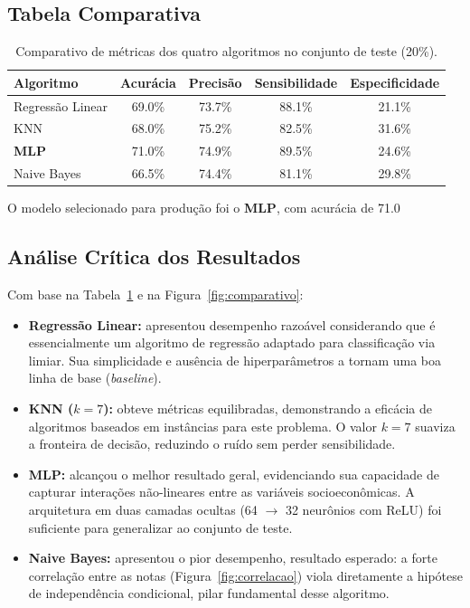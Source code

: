 \documentclass[12pt, a4paper]{article}
\begin{document}
\subsection{Tabela Comparativa}

\begin{table}[H]
  \centering
  \caption{Comparativo de métricas dos quatro algoritmos no conjunto de teste (20\%).}
  \label{tab:metricas}
  \begin{tabular}{lcccc}
    \toprule
    \textbf{Algoritmo} & \textbf{Acurácia} & \textbf{Precisão} &
    \textbf{Sensibilidade} & \textbf{Especificidade} \\
    \midrule
        Regressão Linear & 69.0\% & 73.7\% & 88.1\% & 21.1\% \\
        KNN & 68.0\% & 75.2\% & 82.5\% & 31.6\% \\
        \textbf{MLP} & 71.0\% & 74.9\% & 89.5\% & 24.6\% \\
        Naive Bayes & 66.5\% & 74.4\% & 81.1\% & 29.8\% \\
    \bottomrule
  \end{tabular}
\end{table}

O modelo selecionado para produção foi o \textbf{MLP},
com acurácia de 71.0%

\subsection{Análise Crítica dos Resultados}

Com base na Tabela~\ref{tab:metricas} e na Figura~\ref{fig:comparativo}:

\begin{itemize}
  \item \textbf{Regressão Linear:} apresentou desempenho razoável
  considerando que é essencialmente um algoritmo de regressão adaptado para
  classificação via limiar. Sua simplicidade e ausência de hiperparâmetros
  a tornam uma boa linha de base (\textit{baseline}).

  \item \textbf{KNN ($k=7$):} obteve métricas equilibradas, demonstrando a
  eficácia de algoritmos baseados em instâncias para este problema. O valor
  $k=7$ suaviza a fronteira de decisão, reduzindo o ruído sem perder
  sensibilidade.

  \item \textbf{MLP:} alcançou o melhor resultado geral, evidenciando sua
  capacidade de capturar interações não-lineares entre as variáveis
  socioeconômicas. A arquitetura em duas camadas ocultas (64 $\to$ 32
  neurônios com ReLU) foi suficiente para generalizar ao conjunto de teste.

  \item \textbf{Naive Bayes:} apresentou o pior desempenho, resultado esperado:
  a forte correlação entre as notas (Figura~\ref{fig:correlacao}) viola
  diretamente a hipótese de independência condicional, pilar fundamental
  desse algoritmo.
\end{itemize}
\end{document}
